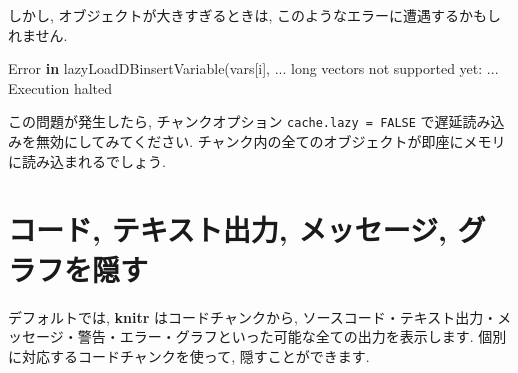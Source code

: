\documentclass[
  11pt,
  lualatex,
  ja=standard]{bxjsreport}
\newenvironment{Shaded}{\begin{snugshade}}{\end{snugshade}}
\newcommand{\ControlFlowTok}[1]{\textcolor[rgb]{0.13,0.29,0.53}{\textbf{#1}}}
\newcommand{\FunctionTok}[1]{\textcolor[rgb]{0.00,0.00,0.00}{#1}}
\newcommand{\NormalTok}[1]{#1}
\newcommand{\SpecialCharTok}[1]{\textcolor[rgb]{0.00,0.00,0.00}{#1}}
\begin{document}
しかし, オブジェクトが大きすぎるときは, このようなエラーに遭遇するかもしれません.

\begin{Shaded}
\begin{Highlighting}[]
\NormalTok{Error }\ControlFlowTok{in} \FunctionTok{lazyLoadDBinsertVariable}\NormalTok{(vars[i], ... }
\NormalTok{  long vectors not supported yet}\SpecialCharTok{:}\NormalTok{ ...}
\NormalTok{Execution halted}
\end{Highlighting}
\end{Shaded}

この問題が発生したら, チャンクオプション \texttt{cache.lazy = FALSE} で遅延読み込みを無効にしてみてください. チャンク内の全てのオブジェクトが即座にメモリに読み込まれるでしょう.

\hypertarget{hide-one}{%
\section{コード, テキスト出力, メッセージ, グラフを隠す}\label{hide-one}}

デフォルトでは, \textbf{knitr} はコードチャンクから, ソースコード・テキスト出力・メッセージ・警告・エラー・グラフといった可能な全ての出力を表示します. 個別に対応するコードチャンクを使って, 隠すことができます.
\end{document}
